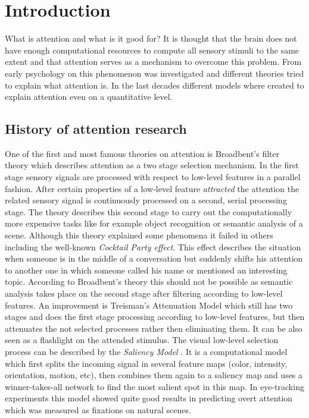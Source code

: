 \chapter{Introduction} %
\label{sg:cha:introduction}

What is attention and what is it good for? It is thought that the brain does not have enough computational resources to compute all sensory stimuli to the same extent and that attention serves as a mechanism to overcome this problem. From early psychology on this phenomenon was investigated \citep{James:1890tq} and different theories tried to explain what attention is. In the last decades different models where created to explain attention even on a quantitative level.

\section{History of attention research} %
\label{sg:sec:attention_as_selection}

One of the first and most famous theories on attention is Broadbent's filter theory \citep{Broadbent:1958ve} which describes attention as a two stage selection mechanism. In the first stage sensory signals are processed with respect to low-level features in a parallel fashion. After certain properties of a low-level feature \emph{attracted} the attention the related sensory signal is continuously processed on a second, serial processing stage. The theory describes this second stage to carry out the computationally more expensive tasks like for example object recognition or semantic analysis of a scene. Although this theory explained some phenomena it failed in others including the well-known \emph{Cocktail Party effect}. This effect describes the situation when someone is in the middle of a conversation but suddenly shifts his attention to another one in which someone called his name or mentioned an interesting topic. According to Broadbent's theory this should not be possible as semantic analysis takes place on the second stage after filtering according to low-level features. An improvement is Treisman's Attenuation Model \citep{Treisman:1964th} which still has two stages and does the first stage processing according to low-level features, but then attenuates the not selected processes rather then eliminating them. It can be also seen as a flashlight on the attended stimulus.
The visual low-level selection process can be described by the \emph{Saliency Model} \citep{Koch:1985wv}. It is a computational model which first splits the incoming signal in several feature maps (color, intensity, orientation, motion, etc), then combines them again to a saliency map and uses a winner-takes-all network to find the most salient spot in this map. In eye-tracking experiments this model showed quite good results in predicting overt attention which was measured as fixations on natural scenes.

